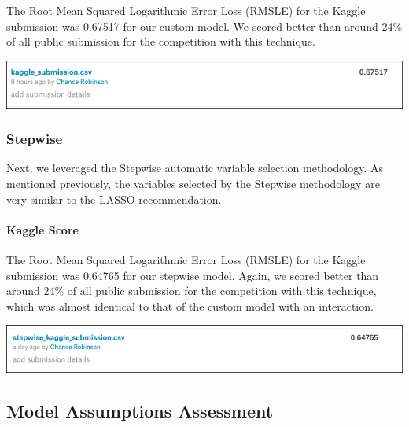 \documentclass[american,]{article}
\let\oldparagraph\paragraph
\renewcommand{\paragraph}[1]{\oldparagraph{#1}\mbox{}}
\begin{document}
The Root Mean Squared Logarithmic Error Loss (RMSLE) for the Kaggle submission was 0.67517 for our custom model. We scored better than around 24\% of all public submission for the competition with this technique.

\label{objective-one:custom-kaggle}

\begin{center}\includegraphics[width=0.9\linewidth]{./images/multiple_linear_regression_custom} \end{center}

\hypertarget{stepwise}{%
\subsubsection{Stepwise}\label{stepwise}}

Next, we leveraged the Stepwise automatic variable selection methodology. As mentioned previously, the variables selected by the Stepwise methodology are very similar to the LASSO recommendation.

\hypertarget{kaggle-score-1}{%
\paragraph{Kaggle Score}\label{kaggle-score-1}}

The Root Mean Squared Logarithmic Error Loss (RMSLE) for the Kaggle submission was 0.64765 for our stepwise model. Again, we scored better than around 24\% of all public submission for the competition with this technique, which was almost identical to that of the custom model with an interaction.

\label{objective-one:stepwise-kaggle}

\begin{center}\includegraphics[width=0.9\linewidth]{./images/multiple_linear_regression_stepwise} \end{center}

\newpage

\hypertarget{model-assumptions-assessment}{%
\subsection{Model Assumptions Assessment}\label{model-assumptions-assessment}}
\end{document}
